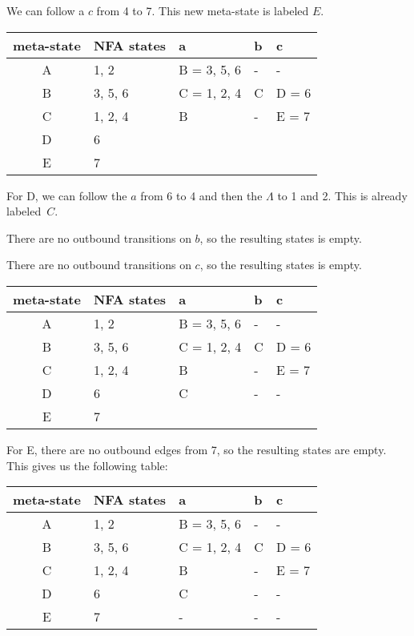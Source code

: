 \documentclass[letterpaper,12pt,openany,reqno]{book}%
\begin{document}
We can follow a $c$ from 4 to 7. This new meta-state is labeled $E$.

\begin{center}
\small
\begin{tabular}{|c|l|l|l|l|}
\hline
\textbf{meta-state} & \textbf{NFA states} & \textbf{a} & \textbf{b} & \textbf{c}\\
\hline
A & 1, 2 & B = 3, 5, 6 & - & -\\
B & 3, 5, 6 & C = 1, 2, 4 & C & D = 6 \\
C & 1, 2, 4 & B & - & E =  7\\
D & 6 & & &\\
E & 7 & & &\\
\hline
\end{tabular}
\end{center}

For D, we can follow the $a$ from 6 to 4 and then the $\Lambda$ to 1 and 2. This is already labeled~$C$.

There are no outbound transitions on $b$, so the resulting states is empty.

There are no outbound transitions on $c$, so the resulting states is empty.

\begin{center}
\small
\begin{tabular}{|c|l|l|l|l|}
\hline
\textbf{meta-state} & \textbf{NFA states} & \textbf{a} & \textbf{b} & \textbf{c}\\
\hline
A & 1, 2 & B = 3, 5, 6 & - & -\\
B & 3, 5, 6 & C = 1, 2, 4 & C & D = 6 \\
C & 1, 2, 4 & B & - & E = 7\\
D & 6 & C & - & -\\
E & 7 & & &\\
\hline
\end{tabular}
\end{center}

For E, there are no outbound edges from 7, so the resulting states are empty. This gives us the following table:

\begin{center}
\small
\begin{tabular}{|c|l|l|l|l|}
\hline
\textbf{meta-state} & \textbf{NFA states} & \textbf{a} & \textbf{b} & \textbf{c}\\
\hline
A & 1, 2 & B = 3, 5, 6 & - & -\\
B & 3, 5, 6 & C = 1, 2, 4 & C & D = 6 \\
C & 1, 2, 4 & B & - & E = 7\\
D & 6 & C & - & -\\
E & 7 & - & - & -\\
\hline
\end{tabular}
\end{center}
\end{document}
